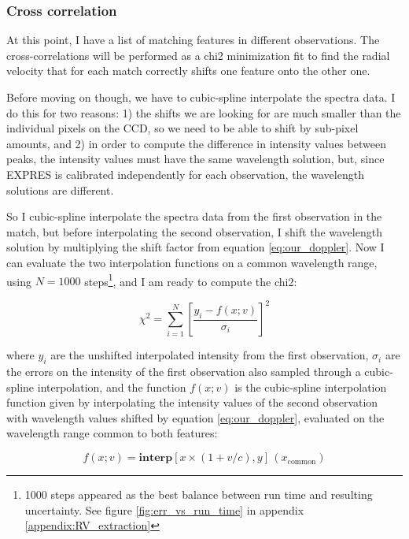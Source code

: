     \subsubsection{Cross correlation}

    At this point, I have a list of matching features in different observations. The cross-correlations will be performed as a chi2 minimization fit to find the radial velocity that for each match correctly shifts one feature onto the other one.
    
    Before moving on though, we have to cubic-spline interpolate the spectra data. I do this for two reasons: 1) the shifts we are looking for are much smaller than the individual pixels on the CCD, so we need to be able to shift by sub-pixel amounts, and 2) in order to compute the difference in intensity values between peaks, the intensity values must have the same wavelength solution, but, since EXPRES is calibrated independently for each observation, the wavelength solutions are different.
    
    So I cubic-spline interpolate the spectra data from the first observation in the match, but before interpolating the second observation, I shift the wavelength solution by multiplying the shift factor from equation \ref{eq:our_doppler}. Now I can evaluate the two interpolation functions on a common wavelength range, using $N=1000$ steps\footnote{1000 steps appeared as the best balance between run time and resulting uncertainty. See figure \ref{fig:err_vs_run_time} in appendix \ref{appendix:RV_extraction}}, and I am ready to compute the chi2:
        
    \begin{equation}
        \label{eq:shift_fit_chi2}
        \chi^{2}=\sum_{i=1}^{N}\left[\frac{y_{i}-f(x; v)}{\sigma_{i}}\right]^{2}
    \end{equation}
    
    where $y_i$ are the unshifted interpolated intensity from the first observation, $\sigma_i$ are the errors on the intensity of the first observation also sampled through a cubic-spline interpolation, and the function $f(x; v)$ is the cubic-spline interpolation function given by interpolating the intensity values of the second observation with wavelength values shifted by equation \ref{eq:our_doppler}, evaluated on the wavelength range common to both features: 
    
    \begin{equation}
        f(x; v) = \textbf{interp}[x \times ( 1 + v/c), y]\,(x_\text{common})
    \end{equation}
    
